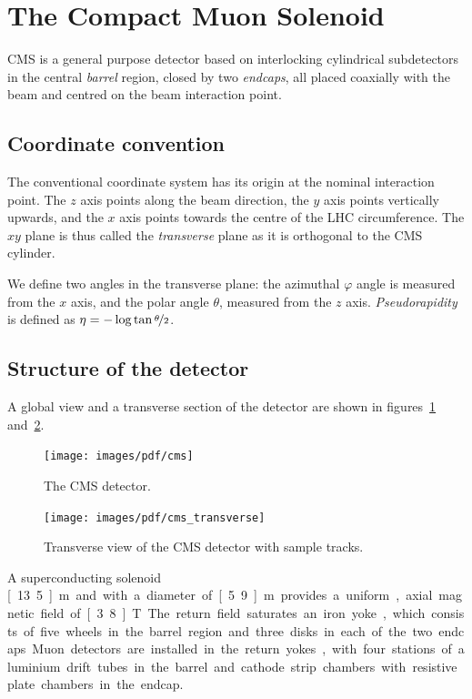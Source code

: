 \section{The Compact Muon Solenoid}
CMS is a general purpose detector based on interlocking cylindrical
subdetectors in the central \emph{barrel} region, closed by two
\emph{endcaps}, all placed coaxially with the beam and centred on the beam interaction point.
\subsection{Coordinate convention}
The conventional coordinate system has its origin at the nominal interaction
point. The $z$ axis points along the beam direction, the $y$ axis points
vertically upwards, and the $x$ axis points towards the centre of the LHC
circumference. The $xy$ plane is thus called the \emph{transverse} plane as
it is orthogonal to the CMS cylinder.

We define two angles in the transverse plane: the azimuthal $\varphi$ angle
is measured from the $x$ axis, and the polar angle $\theta$, measured from
the $z$ axis.
\emph{Pseudorapidity} is defined as $\eta = -\log \tan
\nicefrac{\theta}{2}$.

\subsection{Structure of the detector}
A global view and a transverse section of the detector are shown in
figures~\ref{fig:cms} and~\ref{fig:cms_transverse}.

\begin{figure}[htb]
    \centering
    \texttt{[image: images/pdf/cms]}
    \caption{The CMS detector.}
    \label{fig:cms}
\end{figure}

\begin{figure}[htb]
    \centering
    \texttt{[image: images/pdf/cms\_transverse]}
    \caption{Transverse view of the CMS detector with sample tracks.}
    \label{fig:cms_transverse}
\end{figure}

A superconducting solenoid \unit[13.5]{m} and with a diameter of
\unit[5.9]{m} provides a uniform, axial magnetic field of \unit[3.8]{T}.
The return field saturates an iron yoke, which consists of five wheels in
the barrel region and three disks in each of the two endcaps.
Muon detectors are installed in the return yokes, with four stations of
aluminium drift tubes in the barrel and cathode strip chambers with
resistive plate chambers in the endcap.

